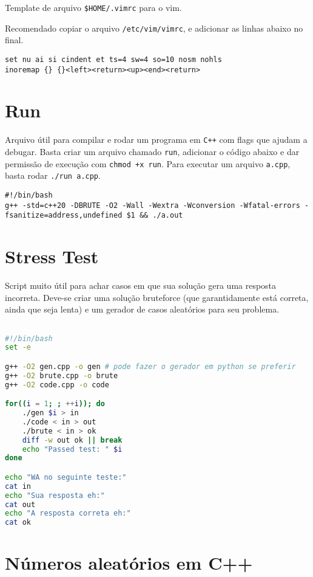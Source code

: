 Template de arquivo \texttt{\$HOME/.vimrc} para o vim.

Recomendado copiar o arquivo \texttt{/etc/vim/vimrc}, e adicionar as linhas abaixo no final.

\begin{lstlisting}
set nu ai si cindent et ts=4 sw=4 so=10 nosm nohls
inoremap {} {}<left><return><up><end><return>
\end{lstlisting}

\section{Run}

Arquivo útil para compilar e rodar um programa em \texttt{C++} com flags que ajudam a debugar.
Basta criar um arquivo chamado \texttt{run}, adicionar o código abaixo e dar permissão de execução com \texttt{chmod +x run}.
Para executar um arquivo \texttt{a.cpp}, basta rodar \texttt{./run a.cpp}.

\begin{lstlisting}
#!/bin/bash
g++ -std=c++20 -DBRUTE -O2 -Wall -Wextra -Wconversion -Wfatal-errors -fsanitize=address,undefined $1 && ./a.out
\end{lstlisting}

\section{Stress Test}

Script muito útil para achar casos em que sua solução gera uma resposta incorreta.
Deve-se criar uma solução bruteforce (que garantidamente está correta, ainda que seja lenta) e um gerador de casos aleatórios para seu problema.

\begin{lstlisting}[language=Bash]

#!/bin/bash
set -e

g++ -O2 gen.cpp -o gen # pode fazer o gerador em python se preferir
g++ -O2 brute.cpp -o brute
g++ -O2 code.cpp -o code

for((i = 1; ; ++i)); do
    ./gen $i > in
    ./code < in > out
    ./brute < in > ok
    diff -w out ok || break
    echo "Passed test: " $i
done

echo "WA no seguinte teste:"
cat in
echo "Sua resposta eh:"
cat out
echo "A resposta correta eh:"
cat ok

\end{lstlisting}

\section{Números aleatórios em C++}

